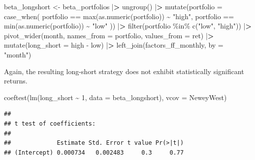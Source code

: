 \documentclass[
]{book}
\newenvironment{Shaded}{\begin{snugshade}}{\end{snugshade}}
\newcommand{\AttributeTok}[1]{\textcolor[rgb]{0.61,0.61,0.61}{#1}}
\newcommand{\DecValTok}[1]{\textcolor[rgb]{0.06,0.06,0.06}{#1}}
\newcommand{\ErrorTok}[1]{\textcolor[rgb]{0.14,0.14,0.14}{\textbf{#1}}}
\newcommand{\FunctionTok}[1]{\textcolor[rgb]{0,0,0}{#1}}
\newcommand{\NormalTok}[1]{#1}
\newcommand{\OtherTok}[1]{\textcolor[rgb]{0.37,0.37,0.37}{#1}}
\newcommand{\SpecialCharTok}[1]{\textcolor[rgb]{0,0,0}{#1}}
\newcommand{\StringTok}[1]{\textcolor[rgb]{0.5,0.5,0.5}{#1}}
\begin{document}
\begin{Shaded}
\begin{Highlighting}[]
\NormalTok{beta\_longshort }\OtherTok{\textless{}{-}}\NormalTok{ beta\_portfolios }\SpecialCharTok{|}\ErrorTok{\textgreater{}}
  \FunctionTok{ungroup}\NormalTok{() }\SpecialCharTok{|}\ErrorTok{\textgreater{}}
  \FunctionTok{mutate}\NormalTok{(}\AttributeTok{portfolio =} \FunctionTok{case\_when}\NormalTok{(}
\NormalTok{    portfolio }\SpecialCharTok{==} \FunctionTok{max}\NormalTok{(}\FunctionTok{as.numeric}\NormalTok{(portfolio)) }\SpecialCharTok{\textasciitilde{}} \StringTok{"high"}\NormalTok{,}
\NormalTok{    portfolio }\SpecialCharTok{==} \FunctionTok{min}\NormalTok{(}\FunctionTok{as.numeric}\NormalTok{(portfolio)) }\SpecialCharTok{\textasciitilde{}} \StringTok{"low"}
\NormalTok{  )) }\SpecialCharTok{|}\ErrorTok{\textgreater{}}
  \FunctionTok{filter}\NormalTok{(portfolio }\SpecialCharTok{\%in\%} \FunctionTok{c}\NormalTok{(}\StringTok{"low"}\NormalTok{, }\StringTok{"high"}\NormalTok{)) }\SpecialCharTok{|}\ErrorTok{\textgreater{}}
  \FunctionTok{pivot\_wider}\NormalTok{(month, }\AttributeTok{names\_from =}\NormalTok{ portfolio, }\AttributeTok{values\_from =}\NormalTok{ ret) }\SpecialCharTok{|}\ErrorTok{\textgreater{}}
  \FunctionTok{mutate}\NormalTok{(}\AttributeTok{long\_short =}\NormalTok{ high }\SpecialCharTok{{-}}\NormalTok{ low) }\SpecialCharTok{|}\ErrorTok{\textgreater{}}
  \FunctionTok{left\_join}\NormalTok{(factors\_ff\_monthly, }\AttributeTok{by =} \StringTok{"month"}\NormalTok{)}
\end{Highlighting}
\end{Shaded}

Again, the resulting long-short strategy does not exhibit statistically significant returns.

\begin{Shaded}
\begin{Highlighting}[]
\FunctionTok{coeftest}\NormalTok{(}\FunctionTok{lm}\NormalTok{(long\_short }\SpecialCharTok{\textasciitilde{}} \DecValTok{1}\NormalTok{, }\AttributeTok{data =}\NormalTok{ beta\_longshort), }
         \AttributeTok{vcov =}\NormalTok{ NeweyWest)}
\end{Highlighting}
\end{Shaded}

\begin{verbatim}
## 
## t test of coefficients:
## 
##             Estimate Std. Error t value Pr(>|t|)
## (Intercept) 0.000734   0.002483     0.3     0.77
\end{verbatim}
\end{document}

